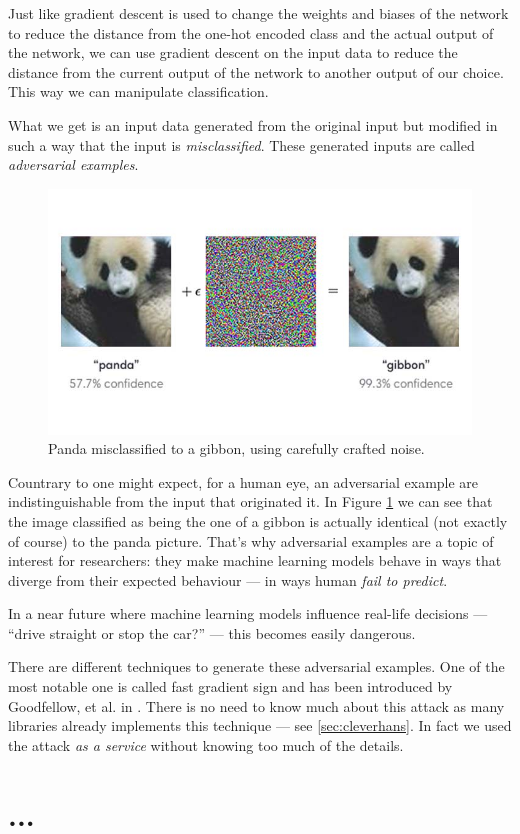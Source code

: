 Just like gradient descent is used to change the weights and biases of
the network to reduce the distance from the one-hot encoded class and
the actual output of the network, we can use gradient descent on the
input data to reduce the distance from the current output of the network to
another output of our choice. This way we can manipulate classification.

What we get is an input data generated from the original input but
modified in such a way that the input is \emph{misclassified}. These
generated inputs are called \emph{adversarial examples}.

\begin{figure}
  \centering
  \includegraphics[width=0.5\linewidth]{Images/panda-gibbon.jpg}
  \caption{Panda misclassified to a gibbon, using carefully crafted
    noise.}
  \label{fig:panda-gibbon}
\end{figure}

Countrary to one might expect, for a human eye, an adversarial example
are indistinguishable from the input that originated it. In Figure
\ref{fig:panda-gibbon} we can see that the image classified as being
the one of a gibbon is actually identical (not exactly of course) to
the panda picture. That's why adversarial examples are a topic of
interest for researchers: they make machine learning models behave in
ways that diverge from their expected behaviour --- in ways human
\emph{fail to predict}.

In a near future where machine learning models influence real-life
decisions --- ``drive straight or stop the car?'' --- this becomes
easily dangerous.

There are different techniques to generate these adversarial examples.
One of the most notable one is called fast gradient sign and has been
introduced by Goodfellow, et al. in \cite{goodfellow6572explaining}.
There is no need to know much about this attack as many libraries
already implements this technique --- see \ref{sec:cleverhans}. In fact
we used the attack \emph{as a service} without knowing too much of the
details.

\section{...}
